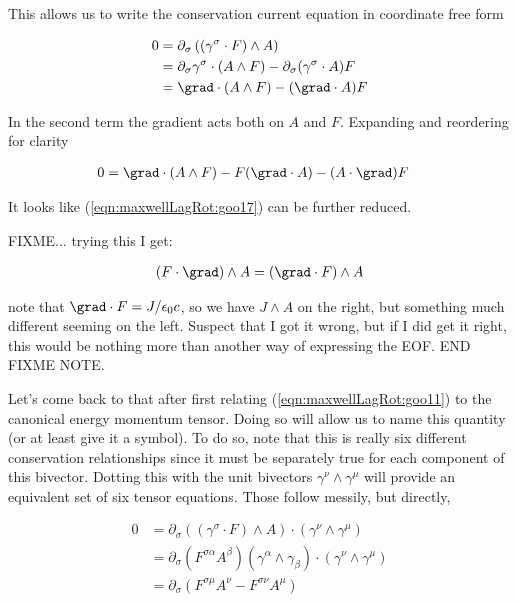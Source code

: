 This allows us to write the conservation current equation in coordinate free form

\begin{align*}
0 
&= \partial_\sigma \left( (\gamma^\sigma \cdot F) \wedge A \right) \\
&= \partial_\sigma \gamma^\sigma \cdot (A \wedge F ) - \partial_\sigma (\gamma^\sigma \cdot A) F \\
&= \grad \cdot (A \wedge F ) - (\grad \cdot A) F \\
\end{align*}

In the second term the gradient acts both on $A$ and $F$.  Expanding and reordering for clarity

\begin{align}\label{eqn:maxwellLagRot:goo17}
0 &= \grad \cdot (A \wedge F ) - F (\grad \cdot A) - (A \cdot \grad) F 
\end{align}

It looks like (\ref{eqn:maxwellLagRot:goo17}) can be further reduced.

FIXME... trying this I get:

\begin{align}\label{eqn:maxwellLagRot:goo20}
( F \cdot \grad ) \wedge A = (\grad \cdot F) \wedge A
\end{align}

note that $\grad \cdot F = J/\epsilon_0 c$, so we have $J \wedge A$ on the right, but something much different seeming on the left.  Suspect that I got it wrong, but if I did get it right, this would be nothing more than another way of expressing the EOF.  END FIXME NOTE.

Let's come back to that after first relating (\ref{eqn:maxwellLagRot:goo11}) to the canonical energy momentum tensor.  Doing so will allow us to name this quantity (or at least give it a symbol).  To do so, note that this is really six different conservation relationships since it must be separately true for each component of this bivector.   Dotting this with the unit bivectors $\gamma^\nu \wedge \gamma^\mu$ will provide an equivalent set of six tensor equations.  Those follow messily, but directly,

\begin{align*}
0
&=
\partial_\sigma \left( (\gamma^\sigma \cdot F) \wedge A \right)  \cdot (\gamma^\nu \wedge \gamma^\mu) \\
&=
\partial_\sigma (F^{\sigma\alpha} A^\beta) (\gamma^\alpha \wedge \gamma_\beta) \cdot (\gamma^\nu \wedge \gamma^\mu) \\
&=
\partial_\sigma (F^{\sigma\mu} A^\nu -F^{\sigma\nu} A^\mu )
\end{align*}

